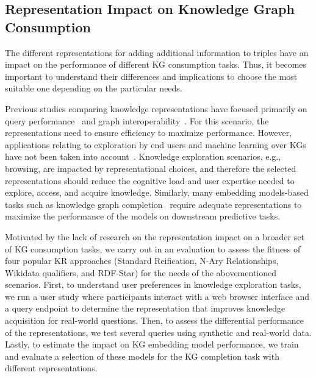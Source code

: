 \subsection{Representation Impact on Knowledge Graph Consumption}


The different representations for adding additional information to triples have an impact on the performance of different KG consumption tasks. Thus, it becomes important to understand their differences and implications to choose the most suitable one depending on the particular needs. 

Previous studies comparing knowledge representations have focused primarily on query performance~\parencite{das2014tale,nguyen2014don,alocci2015property,hernandez2015reifying,frey2019evaluation,orlandi2021benchmarking} and graph interoperability~\parencite{angles2019rdf,angles2020mapping}. For this scenario, the representations need to ensure efficiency to maximize performance. 
However, applications relating to exploration by end users and machine learning over KGs have not been taken into account~\parencite{karger2014semantic,hogan2020twodecades}. 
Knowledge exploration scenarios, e.g., browsing, are impacted by representational choices, and therefore the selected representations should reduce the cognitive load and user expertise needed to explore, access, and acquire knowledge.
Similarly, many embedding models-based tasks such as knowledge graph completion~\parencite{ren2022smore} require adequate representations to maximize the performance of the models on downstream predictive tasks.

Motivated by the lack of research on the representation impact on a broader set of KG consumption tasks, we carry out in \parencite{iglesias2023kgconsumption} an evaluation to assess the fitness of four popular KR approaches (Standard Reification, N-Ary Relationships, Wikidata qualifiers, and RDF-Star) for the needs of the abovementioned scenarios. 
First, to understand user preferences in knowledge exploration tasks, we run a user study where participants interact with a web browser interface and a query endpoint to determine the representation that improves knowledge acquisition for real-world questions.
Then, to assess the differential performance of the representations, we test several queries using synthetic and real-world data.
Lastly, to estimate the impact on KG embedding model performance, we train and evaluate a selection of these models for the KG completion task with different representations.



